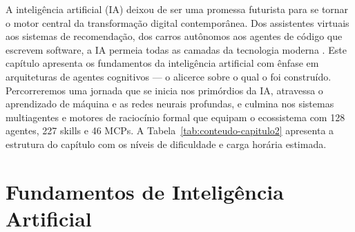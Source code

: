 A inteligência artificial (IA) deixou de ser uma promessa futurista para se
tornar o motor central da transformação digital contemporânea. Dos assistentes
virtuais aos sistemas de recomendação, dos carros autônomos aos agentes de
código que escrevem software, a IA permeia todas as camadas da tecnologia
moderna \cite{russell2020inteligencia, lecun2015deep}.
Este capítulo apresenta os fundamentos da inteligência artificial com ênfase
em arquiteturas de agentes cognitivos --- o alicerce sobre o qual o
\opencodeeco{} foi construído. Percorreremos uma jornada que se inicia nos
primórdios da IA, atravessa o aprendizado de máquina e as redes neurais
profundas, e culmina nos sistemas multiagentes e motores de raciocínio formal
que equipam o ecossistema com 128 agentes, 227 skills e 46 MCPs.
A Tabela~\ref{tab:conteudo-capitulo2} apresenta a estrutura do capítulo com
os níveis de dificuldade e carga horária estimada.
\begin{table}[htb]
\centering
    \small
\caption{Conteúdo do Capítulo 2}
\label{tab:conteudo-capitulo2}
\end{table}
\section{Fundamentos de Inteligência Artificial}
\label{sec:fundamentos-ia}
\nivelzero

